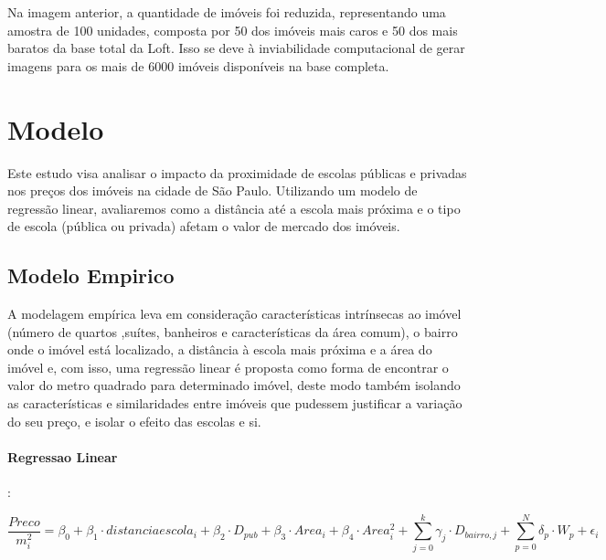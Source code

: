 Na imagem anterior, a quantidade de imóveis foi reduzida, representando uma amostra de 100 unidades, composta por 50 dos imóveis mais caros e 50 dos mais baratos da base total da Loft. Isso se deve à inviabilidade computacional de gerar imagens para os mais de 6000 imóveis disponíveis na base completa.

\section{Modelo}
Este estudo visa analisar o impacto da proximidade de escolas públicas e privadas nos preços dos imóveis na cidade de São Paulo. Utilizando um modelo de regressão linear, avaliaremos como a distância até a escola mais próxima e o tipo de escola (pública ou privada) afetam o valor de mercado dos imóveis.
    
\subsection{Modelo Empirico}

A modelagem empírica leva em consideração características intrínsecas ao imóvel (número de quartos ,suítes, banheiros e características da área comum), o bairro onde o imóvel está localizado, a distância à escola mais próxima e a área do imóvel e, com isso, uma regressão linear é proposta como forma de encontrar o valor do metro quadrado para determinado imóvel, deste modo também isolando as características e similaridades entre imóveis que pudessem justificar a variação do seu preço, e isolar o efeito das escolas e si.

\paragraph{Regressao Linear}:

\vspace{0.2em}

\begin{equation}
    \frac{Preco}{m_{i}^2} = \beta_{0} + \beta_{1} \cdot distanciaescola_{i} + \beta_{2} \cdot D_{pub} + \beta_{3} \cdot Area_{i} + \beta_{4} \cdot Area_{i}^2 + \sum_{j=0}^{k} \gamma_{j} \cdot D_{bairro,j} + \sum_{p=0}^{N} \delta_{p} \cdot W_{p} + \epsilon_{i}
\end{equation}


